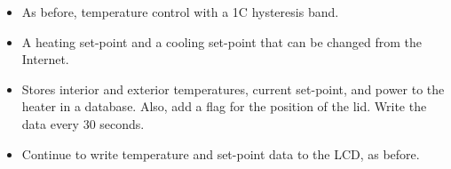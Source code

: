 \documentclass[11pt]{article} %
\begin{document}
\begin{itemize}
\item As before, temperature control with a 1C hysteresis band.
\item A heating set-point and a cooling set-point that can be changed from the Internet. %
\item Stores interior and exterior temperatures, current set-point, and power to the heater in a database. Also, add a flag for the position of the lid. Write the data every 30 seconds.
\item Continue to write temperature and set-point data to the LCD, as before.
\end{itemize}
\end{document}
